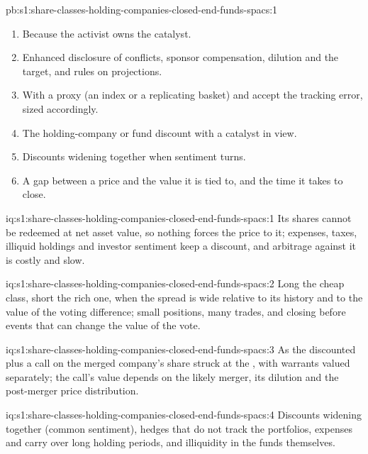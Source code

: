\begin{solution}{pb:s1:share-classes-holding-companies-closed-end-funds-spacs:1}
\begin{enumerate}
\item Because the activist owns the catalyst.
\item Enhanced disclosure of conflicts, sponsor compensation, dilution and the target, and rules on projections.
\item With a proxy (an index or a replicating basket) and accept the tracking error, sized accordingly.
\item The holding-company or fund discount with a catalyst in view.
\item Discounts widening together when sentiment turns.
\item A gap between a price and the value it is tied to, and the time it takes to close.
\end{enumerate}
\end{solution}

\begin{solution}{iq:s1:share-classes-holding-companies-closed-end-funds-spacs:1}
Its shares cannot be redeemed at net asset value, so nothing forces the price to it; expenses, taxes, illiquid holdings and investor sentiment keep a
discount, and arbitrage against it is costly and slow.
\end{solution}

\begin{solution}{iq:s1:share-classes-holding-companies-closed-end-funds-spacs:2}
Long the cheap class, short the rich one, when the spread is wide relative to its history and to the value of the voting difference; small positions, many
trades, and closing before events that can change the value of the vote.
\end{solution}

\begin{solution}{iq:s1:share-classes-holding-companies-closed-end-funds-spacs:3}
As the discounted  plus a call on the merged company's share struck at the , with warrants valued separately; the call's value depends
on the likely merger, its dilution and the post-merger price distribution.
\end{solution}

\begin{solution}{iq:s1:share-classes-holding-companies-closed-end-funds-spacs:4}
Discounts widening together (common sentiment), hedges that do not track the portfolios, expenses and carry over long holding periods, and illiquidity in
the funds themselves.
\end{solution}


